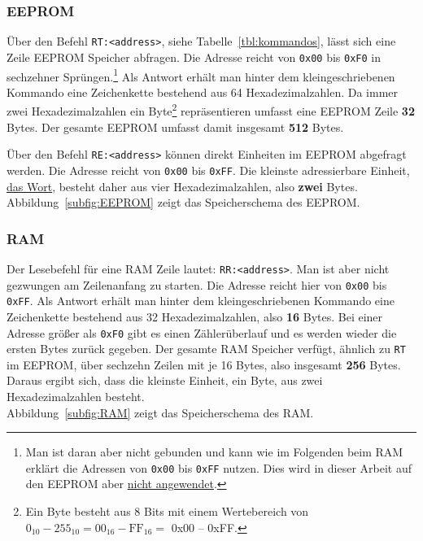 \subsubsection{EEPROM}\label{subsubsec:SpeicherDesKaffeevollautomatenEEPROM}
Über den Befehl \texttt{RT:<address>}, siehe Tabelle~\ref{tbl:kommandos}, lässt sich eine Zeile \ac{EEPROM} Speicher abfragen.
Die Adresse reicht von \texttt{0x00} bis \texttt{0xF0} in sechzehner Sprüngen.\footnote{Man ist daran aber nicht gebunden und kann wie im Folgenden beim \ac{RAM} erklärt die Adressen von \texttt{0x00} bis \texttt{0xFF} nutzen. Dies wird in dieser Arbeit auf den \ac{EEPROM} aber \underline{nicht angewendet}.}
Als Antwort erhält man hinter dem kleingeschriebenen Kommando eine Zeichenkette bestehend aus 64 Hexadezimalzahlen.
Da immer zwei Hexadezimalzahlen ein Byte\footnote{Ein Byte besteht aus 8 Bits mit einem Wertebereich von $0_{10}-255_{10} = 00_{16}-\text{FF}_{16} = $ 0x00 -- 0xFF.} repräsentieren umfasst eine \ac{EEPROM} Zeile \textbf{32} Bytes.
Der gesamte \ac{EEPROM} umfasst damit insgesamt \textbf{512} Bytes.

Über den Befehl \texttt{RE:<address>} können direkt Einheiten im \ac{EEPROM} abgefragt werden. Die Adresse reicht von \texttt{0x00} bis \texttt{0xFF}.
Die kleinste adressierbare Einheit, \underline{das Wort}, besteht daher aus vier Hexadezimalzahlen, also \textbf{zwei} Bytes.\\
Abbildung~\ref{subfig:EEPROM} zeigt das Speicherschema des \ac{EEPROM}.

\subsubsection{RAM}\label{subsubsec:SpeicherDesKaffeevollautomatenRAM}
Der Lesebefehl für eine \ac{RAM} Zeile lautet: \texttt{RR:<address>}.
Man ist aber nicht gezwungen am Zeilenanfang zu starten.
Die Adresse reicht hier von \texttt{0x00} bis \texttt{0xFF}.
Als Antwort erhält man hinter dem kleingeschriebenen Kommando eine Zeichenkette bestehend aus 32 Hexadezimalzahlen, also \textbf{16} Bytes.
Bei einer Adresse größer als \texttt{0xF0} gibt es einen Zählerüberlauf und es werden wieder die ersten Bytes zurück gegeben.
Der gesamte \ac{RAM} Speicher verfügt, ähnlich zu \texttt{RT} im \ac{EEPROM}, über sechzehn Zeilen mit je 16 Bytes, also insgesamt \textbf{256} Bytes.
Daraus ergibt sich, dass die kleinste Einheit, ein Byte, aus zwei Hexadezimalzahlen besteht.\\
Abbildung~\ref{subfig:RAM} zeigt das Speicherschema des \ac{RAM}.




